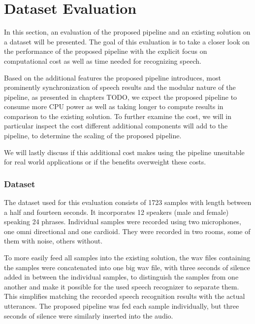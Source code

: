 

\section{Dataset Evaluation}
\label{eval:dataset}

In this section, an evaluation of the proposed pipeline and an existing solution on a dataset will be presented.
The goal of this evaluation is to take a closer look on the performance of the proposed pipeline with the explicit focus on computational cost as well as time needed for recognizing speech.

Based on the additional features the proposed pipeline introduces, most prominently synchronization of speech results and the modular nature of the pipeline, as presented in chapters TODO, we expect the proposed pipeline to consume more CPU power as well as taking longer to compute results in comparison to the existing solution.
To further examine the cost, we will in particular inspect the cost different additional components will add to the pipeline, to determine the scaling of the proposed pipeline.

We will lastly discuss if this additional cost makes using the pipeline unsuitable for real world applications or if the benefits overweight these costs.

\subsubsection{Dataset}
\label{eval:dataset:dataset}

The dataset used for this evaluation consists of 1723 samples with length between a half and fourteen seconds.
It incorporates 12 speakers (male and female) speaking 24 phrases. 
Individual samples were recorded using two microphones, one omni directional and one cardioid.
They were recorded in two rooms, some of them with noise, others without.

To more easily feed all samples into the existing solution, the wav files containing the samples were concatenated into one big wav file, with three seconds of silence added in between the individual samples, to distinguish the samples from one another and make it possible for the used speech recognizer to separate them.
This simplifies matching the recorded speech recognition results with the actual utterances.
The proposed pipeline was fed each sample individually, but three seconds of silence were similarly inserted into the audio.

